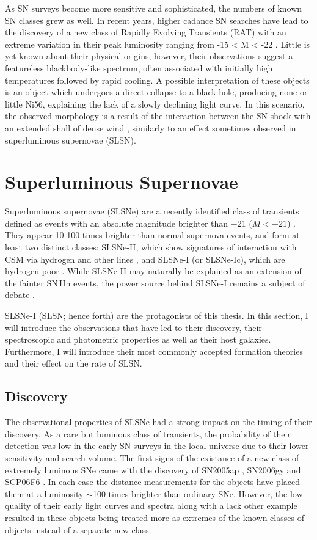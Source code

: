 As SN surveys become more sensitive and sophisticated, the numbers of known SN classes grew as well. In recent years, higher cadance SN searches have lead to the discovery of a new class of Rapidly Evolving Transients (RAT) with an extreme variation in their peak luminosity ranging from -15 < M < -22 \citep{Pursiainen2018}. Little is yet known about their physical origins, however, their observations suggest a featureless blackbody-like spectrum, often associated with initially high temperatures followed by rapid cooling. A possible interpretation of these objects is an object which undergoes a direct collapse to a black hole, producing none or little Ni56, explaining the lack of a slowly declining light curve. In this scenario, the observed morphology is a result of the interaction between the SN shock with an extended shall of dense wind \citep{Piro2015}, similarly to an effect sometimes observed in superluminous supernovae (SLSN).

\section{Superluminous Supernovae}
Superluminous supernovae (SLSNe) are a recently identified class of transients defined as events with an absolute magnitude brighter than $-$21 ($M<-21$) \citep{Gal-Yam2012}. They appear 10-100 times brighter than normal supernova events, and form at least two distinct classes: SLSNe-II, which show signatures of interaction with CSM via hydrogen and other lines \citep{Ofek2006,Smith2006,Drake2011}, and SLSNe-I (or SLSNe-Ic), which are hydrogen-poor \citep{Quimby2011}. While SLSNe-II may naturally be explained as an extension of the fainter SN\,IIn events, the power source behind SLSNe-I remains a subject of debate \citep{Gal-Yam2012}.

SLSNe-I (SLSN; hence forth) are the protagonists of this thesis. In this section, I will introduce the observations that have led to their discovery, their spectroscopic and photometric properties as well as their host galaxies. Furthermore, I will introduce their most commonly accepted formation theories and their effect on the rate of SLSN.

\subsection{Discovery}
The observational properties of SLSNe had a strong impact on the timing of their discovery. As a rare but luminous class of transients, the probability of their detection was low in the early SN surveys in the local universe due to their lower sensitivity and search volume. The first signs of the existance of a new class of extremely luminous SNe came with the discovery of SN2005ap \citep{Quimby2007}, SN2006gy \citep{Ofek2007} and SCP06F6 \citep{Barbary2009}. In each case the distance measurements for the objects have placed them at a luminosity $\sim$100 times brighter than ordinary SNe. However, the low quality of their early light curves and spectra along with a lack other example resulted in these objects being treated more as extremes of the known classes of objects instead of a separate new class.

